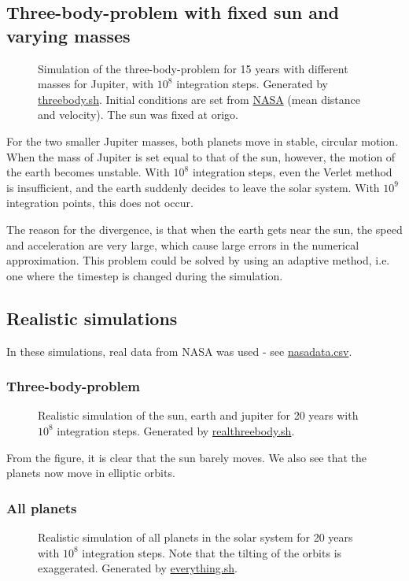\documentclass[12pt,english,a4paper]{article}
\newcommand{\program}[1]{\href{https://github.com/anjohan/Offentlig/blob/master/FYS3150/Oblig3/#1}{#1}}
\begin{document}
\subsection{Three-body-problem with fixed sun and varying masses}
\begin{figure}[H]
\centering

\caption{Simulation of the three-body-problem for 15 years with different masses for Jupiter, with \(10^8\) integration steps. Generated by \program{threebody.sh}. Initial conditions are set from \href{http://nssdc.gsfc.nasa.gov/planetary/factsheet/jupiterfact.html}{NASA} (mean distance and velocity). The sun was fixed at origo.}
\end{figure}
For the two smaller Jupiter masses, both planets move in stable, circular motion. When the mass of Jupiter is set equal to that of the sun, however, the motion of the earth becomes unstable. With \(10^8\) integration steps, even the Verlet method is insufficient, and the earth suddenly decides to leave the solar system. With \(10^9\) integration points, this does not occur.

The reason for the divergence, is that when the earth gets near the sun, the speed and acceleration are very large, which cause large errors in the numerical approximation. This problem could be solved by using an adaptive method, i.e. one where the timestep is changed during the simulation.

\subsection{Realistic simulations}
In these simulations, real data from NASA was used - see \program{nasadata.csv}.
\subsubsection{Three-body-problem}
\begin{figure}[H]
\centering

\caption{Realistic simulation of the sun, earth and jupiter for 20 years with \(10^8\) integration steps. Generated by \program{realthreebody.sh}.}
\end{figure}
From the figure, it is clear that the sun barely moves. We also see that the planets now move in elliptic orbits.

\subsubsection{All planets}
\begin{figure}[H]
\centering

\caption{Realistic simulation of all planets in the solar system for 20 years with \(10^8\) integration steps. Note that the tilting of the orbits is exaggerated. Generated by \program{everything.sh}.}
\end{figure}
\end{document}
